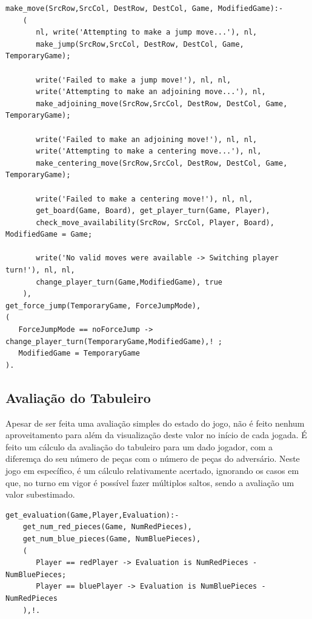 \documentclass[a4paper]{article}
\begin{document}
\begin{lstlisting}[style=customprolog]
make_move(SrcRow,SrcCol, DestRow, DestCol, Game, ModifiedGame):-
	(       
	   nl, write('Attempting to make a jump move...'), nl,
	   make_jump(SrcRow,SrcCol, DestRow, DestCol, Game, TemporaryGame);
	
	   write('Failed to make a jump move!'), nl, nl,
	   write('Attempting to make an adjoining move...'), nl,
	   make_adjoining_move(SrcRow,SrcCol, DestRow, DestCol, Game, TemporaryGame);
	
	   write('Failed to make an adjoining move!'), nl, nl,
	   write('Attempting to make a centering move...'), nl,
	   make_centering_move(SrcRow,SrcCol, DestRow, DestCol, Game, TemporaryGame);
	
	   write('Failed to make a centering move!'), nl, nl,
	   get_board(Game, Board), get_player_turn(Game, Player),
	   check_move_availability(SrcRow, SrcCol, Player, Board), ModifiedGame = Game;
	
	   write('No valid moves were available -> Switching player turn!'), nl, nl,
	   change_player_turn(Game,ModifiedGame), true
	),
get_force_jump(TemporaryGame, ForceJumpMode),
(
   ForceJumpMode == noForceJump -> change_player_turn(TemporaryGame,ModifiedGame),! ;
   ModifiedGame = TemporaryGame
).
\end{lstlisting}

\subsection{Avaliação do Tabuleiro}
Apesar de ser feita uma avaliação simples do estado do jogo, não é feito nenhum aproveitamento para além da visualização deste valor no início de cada jogada. É feito um cálculo da avaliação do tabuleiro para um dado jogador, com a diferemça do seu número de peças com o número de peças do adversário. Neste jogo em específico, é um cálculo relativamente acertado, ignorando os casos em que, no turno em vigor é possível fazer múltiplos saltos, sendo a avaliação um valor subestimado.

\begin{lstlisting}[style=customprolog]
get_evaluation(Game,Player,Evaluation):-
    get_num_red_pieces(Game, NumRedPieces),
    get_num_blue_pieces(Game, NumBluePieces),
    (
       Player == redPlayer -> Evaluation is NumRedPieces - NumBluePieces;
       Player == bluePlayer -> Evaluation is NumBluePieces - NumRedPieces
    ),!.
\end{lstlisting} 
\end{document}
